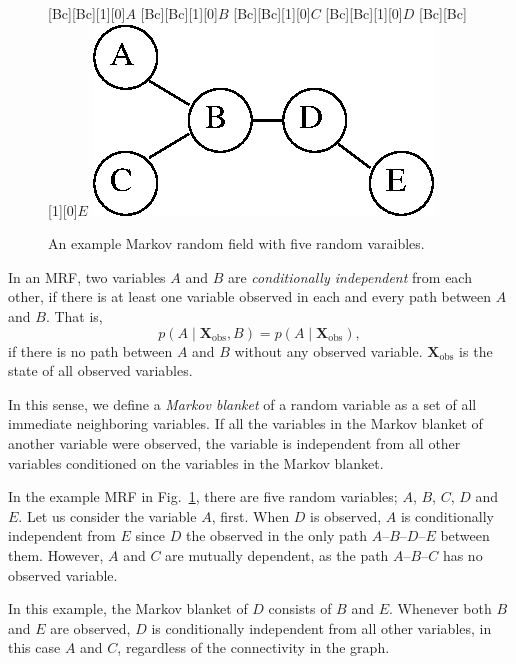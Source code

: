 \documentclass[dissertation,nocontribution,draft*]{aaltoseries}
\newcommand{\matr}[1]{\mathbf{#1}}
\newcommand{\mX}[0]{\matr{X}}
\begin{document}
\begin{figure}[t]
    \centering
    [Bc][Bc][1][0]{$A$}
    [Bc][Bc][1][0]{$B$}
    [Bc][Bc][1][0]{$C$}
    [Bc][Bc][1][0]{$D$}
    [Bc][Bc][1][0]{$E$}
    \includegraphics[width=0.4\columnwidth]{figures/mrf.eps}
    \caption{An example Markov random field with five random
    varaibles.}
    \label{fig:mrf}
\end{figure}


In an MRF, two variables $A$ and $B$ are
\textit{conditionally independent} from each other, if there
is at least one variable observed in each and every path
between $A$ and $B$.
That is, 
\[
p(A \mid \mX_{\text{obs}}, B) = p(A \mid \mX_{\text{obs}}),
\]
if there is no path between $A$ and $B$ without any observed
variable. $\mX_{\text{obs}}$ is the state of all observed
variables.

In this sense, we define a \textit{Markov blanket} of a
random variable as a set of all immediate neighboring
variables. If all the variables in the Markov blanket of another
variable were observed, the variable is independent from all
other variables conditioned on the variables in the Markov
blanket.

In the example MRF in Fig.~\ref{fig:mrf}, there are five
random variables; $A$, $B$, $C$, $D$ and $E$. Let us
consider the variable $A$, first. When $D$ is observed, $A$
is conditionally independent from $E$ since $D$ the observed in the only
path $A$--$B$--$D$--$E$ between them. However,
$A$ and $C$ are mutually dependent, as the path
$A$--$B$--$C$ has no observed variable.

In this example, the Markov blanket of $D$ consists of $B$ and
$E$. Whenever both $B$ and $E$ are observed, $D$ is
conditionally independent from all other variables, in this
case $A$ and $C$, regardless of the connectivity in the
graph.
\end{document}
